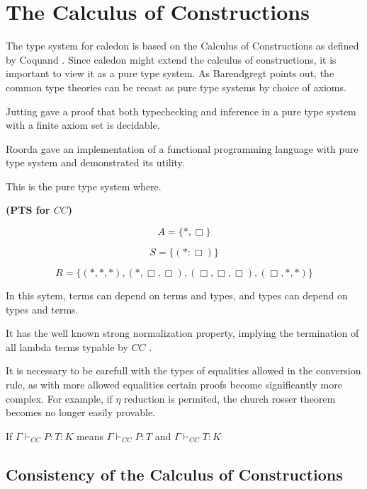 \section{The Calculus of Constructions}

The type system for caledon is based on the Calculus of Constructions as defined by Coquand \citep{coquand1986calculus}.
Since caledon might extend the calculus of constructions, it is important to view it as a pure type system. 
As Barendgregt points out, the common type theories can be recast as pure type systems
by choice of axioms. 

Jutting \citep{jutting1993typing} gave a proof that both typechecking and inference
in a pure type system with a finite axiom set is decidable.

Roorda \citep{roorda2001pure} gave an implementation of a functional programming language with 
pure type system and demonstrated its utility.

This is the pure type system where.

\begin{definition}
\textbf{(PTS for $CC$)}

\[
A = \{ *, \Box \}
\]

\[
S = \{ (* : \Box) \}
\]

\[ 
R = \{ (*,*,*),(*,\Box,\Box),(\Box,\Box,\Box),(\Box,*,*)\}
\]  
\label{coc:types}
\end{definition}

In this sytem, terms can depend on terms and types, 
and types can depend on types and terms.  

It has the well known strong normalization property, implying the termination of 
all lambda terms typable by $CC$ \citep{Geuvers94ashort} \citep{geuvers1991modular}.

It is necessary to be carefull with the types of equalities allowed in the conversion rule, 
as with more allowed equalities certain proofs
become significantly more complex.  For example, if $\eta$ reduction is permited, 
the church rosser theorem becomes no longer easily provable.

\begin{definition}
If $\Gamma \vdash_{CC} P : T : K$ means $\Gamma \vdash_{CC} P : T$ and $\Gamma \vdash_{CC} T : K$
\end{definition}


\subsection{Consistency of the Calculus of Constructions}

